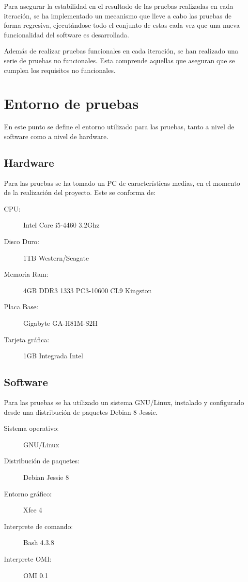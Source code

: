 Para asegurar la estabilidad en el resultado de las pruebas realizadas en cada iteración, se ha implementado un mecanismo
que lleve a cabo las pruebas de forma regresiva, ejecutándose todo el conjunto de estas cada vez que una nueva funcionalidad 
del software es desarrollada. 

Además de realizar pruebas funcionales en cada iteración, se han realizado una serie de pruebas no funcionales. 
Esta comprende aquellas que aseguran que se cumplen los requisitos no funcionales.

\section{Entorno de pruebas}
En este punto se define el entorno utilizado para las pruebas, tanto a nivel de software como a nivel de hardware. 

\subsection{Hardware}
Para las pruebas se ha tomado un PC de características medias, en el momento de la realización del proyecto. Este se conforma de:

\begin{description}
\item [CPU:]  Intel Core i5-4460 3.2Ghz 
\item [Disco Duro:] 1TB Western/Seagate
\item [Memoria Ram:] 4GB DDR3 1333 PC3-10600 CL9 Kingston
\item [Placa Base:] Gigabyte GA-H81M-S2H   
\item [Tarjeta gráfica:] 1GB Integrada Intel 
\end {description}

\subsection{Software}
Para las pruebas se ha utilizado un sistema GNU/Linux, instalado y configurado desde una distribución de paquetes 
Debian 8 Jessie. 

\begin{description}
\item [Sistema operativo:] GNU/Linux 
\item [Distribución de paquetes:] Debian Jessie 8
\item [Entorno gráfico:] Xfce 4
\item [Interprete de comando:] Bash 4.3.8
\item [Interprete OMI:] OMI 0.1
\end{description}

